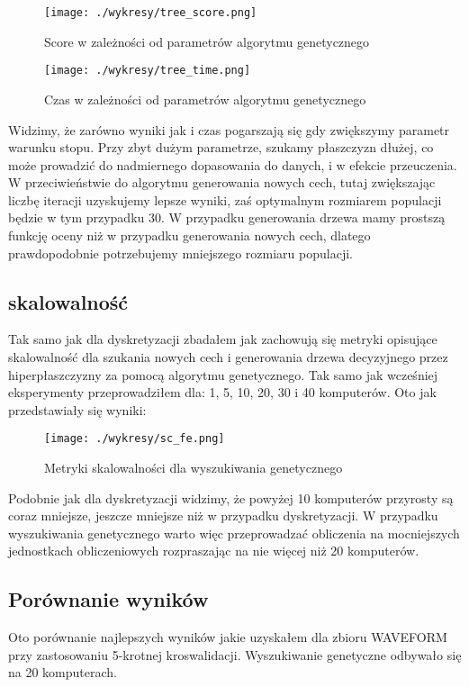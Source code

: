 \documentclass[magisterska]{pracamgr}
\theoremstyle{plain}
\theoremstyle{definition}
\theoremstyle{remark}
\begin{document}
  
\begin{figure}
 \caption{Score w zależności od parametrów algorytmu genetycznego}
 \centering\texttt{[image: ./wykresy/tree\_score.png]}
\end{figure}

\begin{figure}
 \caption{Czas w zależności od parametrów algorytmu genetycznego}
 \centering\texttt{[image: ./wykresy/tree\_time.png]}
\end{figure}

Widzimy, że zarówno wyniki jak i czas pogarszają się gdy zwiększymy parametr warunku stopu. Przy zbyt dużym parametrze, 
szukamy płaszczyzn dłużej, co może prowadzić do nadmiernego dopasowania do danych, i w efekcie przeuczenia.
W przeciwieństwie do algorytmu generowania nowych cech, tutaj zwiększając liczbę iteracji uzyskujemy lepsze wyniki,
zaś optymalnym rozmiarem populacji będzie w tym przypadku 30. W przypadku generowania drzewa mamy prostszą funkcję
oceny niż w przypadku generowania nowych cech, dlatego prawdopodobnie potrzebujemy mniejszego rozmiaru populacji.
\newpage

\subsection{skalowalność}
Tak samo jak dla dyskretyzacji zbadałem jak zachowują się metryki opisujące skalowalność dla szukania nowych cech i generowania
drzewa decyzyjnego przez hiperpłaszczyzny za pomocą algorytmu genetycznego. Tak samo jak wcześniej eksperymenty
przeprowadziłem dla: 1, 5, 10, 20, 30 i 40 komputerów. Oto jak przedstawiały się wyniki:

\begin{figure}
 \caption{Metryki skalowalności dla wyszukiwania genetycznego}
 \centering\texttt{[image: ./wykresy/sc\_fe.png]}
\end{figure}

Podobnie jak dla dyskretyzacji widzimy, że powyżej 10 komputerów przyrosty są coraz mniejsze, jeszcze mniejsze niż w przypadku
dyskretyzacji. W przypadku wyszukiwania genetycznego warto więc przeprowadzać obliczenia na mocniejszych jednostkach obliczeniowych
rozpraszając na nie więcej niż 20 komputerów.
\newpage

\subsection{Porównanie wyników}
Oto porównanie najlepszych wyników jakie uzyskałem dla zbioru WAVEFORM przy zastosowaniu 5-krotnej kroswalidacji.
Wyszukiwanie genetyczne odbywało się na 20 komputerach.
\end{document}
